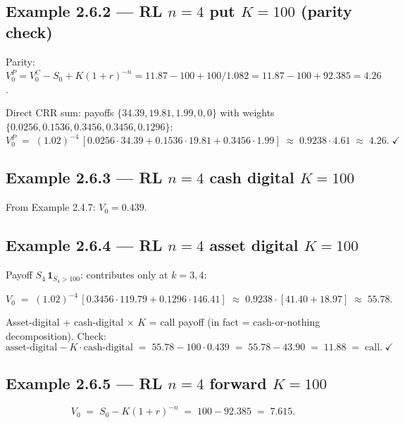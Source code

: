 \documentclass[
  10pt,
  twoside]{book}
\begin{document}
\subsection{\texorpdfstring{Example 2.6.2 --- RL \(n=4\) put \(K=100\)
(parity
check)}{Example 2.6.2 --- RL n=4 put K=100 (parity check)}}\label{example-2.6.2-rl-n4-put-k100-parity-check}

Parity:
\(V^P_0 = V^C_0 - S_0 + K(1+r)^{-n} = 11.87 - 100 + 100/1.082 = 11.87 - 100 + 92.385 = 4.26\).

Direct CRR sum: payoffs \(\{34.39, 19.81, 1.99, 0, 0\}\) with weights
\(\{0.0256, 0.1536, 0.3456, 0.3456, 0.1296\}\): \[
V_0^P \;=\; (1.02)^{-4}\,[0.0256\cdot 34.39 + 0.1536\cdot 19.81 + 0.3456\cdot 1.99]\;\approx\; 0.9238\cdot 4.61 \;\approx\; 4.26.\;\checkmark
\]

\subsection{\texorpdfstring{Example 2.6.3 --- RL \(n=4\) cash digital
\(K=100\)}{Example 2.6.3 --- RL n=4 cash digital K=100}}\label{example-2.6.3-rl-n4-cash-digital-k100}

From Example 2.4.7: \(V_0 = 0.439\).

\subsection{\texorpdfstring{Example 2.6.4 --- RL \(n=4\) asset digital
\(K=100\)}{Example 2.6.4 --- RL n=4 asset digital K=100}}\label{example-2.6.4-rl-n4-asset-digital-k100}

Payoff \(S_4\,\mathbf 1_{S_4>100}\): contributes only at \(k=3,4\):

\[
V_0 \;=\; (1.02)^{-4}\,[0.3456\cdot 119.79 + 0.1296\cdot 146.41] \;\approx\; 0.9238\cdot[41.40 + 18.97] \;\approx\; 55.78.
\]

Asset-digital + cash-digital × \(K\) = call payoff (in fact =
cash-or-nothing decomposition). Check: \[
\text{asset-digital} - K\cdot\text{cash-digital} \;=\; 55.78 - 100\cdot 0.439 \;=\; 55.78 - 43.90 \;=\; 11.88 \;=\; \text{call}.\;\checkmark
\]

\subsection{\texorpdfstring{Example 2.6.5 --- RL \(n=4\) forward
\(K=100\)}{Example 2.6.5 --- RL n=4 forward K=100}}\label{example-2.6.5-rl-n4-forward-k100}

\[
V_0 \;=\; S_0 - K(1+r)^{-n} \;=\; 100 - 92.385 \;=\; 7.615.
\]
\end{document}
